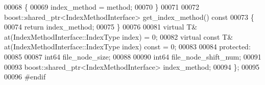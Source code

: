 \begin{DoxyCode}
00068         \{
00069                 index_method = method;
00070         \}
00071 
00072         boost::shared\_ptr<IndexMethodInterface> get\_index\_method()\textcolor{keyword}{ const}
00073 \textcolor{keyword}{        }\{
00074                 \textcolor{keywordflow}{return} index_method;
00075         \}
00076 
00081         \textcolor{keyword}{virtual} T& at(IndexMethodInterface::IndexType index) = 0;
00082         \textcolor{keyword}{virtual} \textcolor{keyword}{const} T& at(IndexMethodInterface::IndexType index) \textcolor{keyword}{const} = 0;
00083 
00084 \textcolor{keyword}{protected}:
00085 
00087         int64 file_node_size;
00088 
00090         int64 file_node_shift_num;
00091 
00093         boost::shared\_ptr<IndexMethodInterface> index_method;
00094 \};
00095 
00096 \textcolor{preprocessor}{#endif}
\end{DoxyCode}
